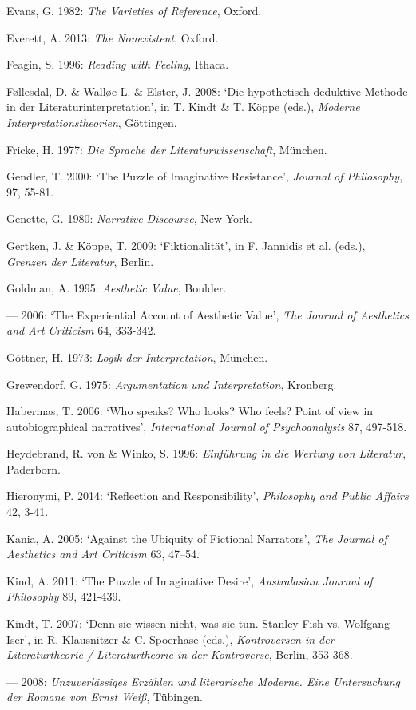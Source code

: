 \begin{hangparas}{.5cm}{1}
Evans, G. 1982: \emph{The Varieties of Reference}, Oxford. 

Everett, A. 2013: \emph{The Nonexistent}, Oxford. 

Feagin, S. 1996: \emph{Reading with Feeling}, Ithaca.

F\o{}llesdal, D. \& Wall\o{}e L. \& Elster, J. 2008: `Die hypothetisch-deduktive Methode in der Literaturinterpretation', in T. Kindt \& T. K\"oppe (eds.), \emph{Moderne Interpretationstheorien}, G\"ottingen.

Fricke, H. 1977: \emph{Die Sprache der Literaturwissenschaft}, M\"unchen.

Gendler, T. 2000: `The Puzzle of Imaginative Resistance', \emph{Journal of Philosophy}, 97, 55-81.

Genette, G. 1980: \emph{Narrative Discourse}, New York. 

Gertken, J. \& K\"oppe, T. 2009: `Fiktionalit\"at', in F. Jannidis et al. (eds.), \emph{Grenzen der Literatur}, Berlin. 

Goldman, A. 1995: \emph{Aesthetic Value}, Boulder. 

--- 2006: `The Experiential Account of Aesthetic Value', \emph{The Journal of Aesthetics and Art Criticism} 64, 333-342.

G\"ottner, H. 1973: \emph{Logik der Interpretation}, M\"unchen.

Grewendorf, G. 1975: \emph{Argumentation und Interpretation}, Kronberg.

Habermas, T. 2006: `Who speaks? Who looks? Who feels? Point of view in autobiographical narratives', \emph{International Journal of Psychoanalysis} 87, 497-518. 

Heydebrand, R. von \& Winko, S. 1996: \emph{Einf\"uhrung in die Wertung von Literatur}, Paderborn.

Hieronymi, P. 2014: `Reflection and Responsibility', \emph{Philosophy and Public Affairs} 42, 3-41.

Kania, A. 2005: `Against the Ubiquity of Fictional Narrators', \emph{The Journal of Aesthetics and Art Criticism} 63, 47--54.

Kind, A. 2011: `The Puzzle of Imaginative Desire', \emph{Australasian Journal of Philosophy} 89, 421-439.

Kindt, T. 2007: `Denn sie wissen nicht, was sie tun. Stanley Fish vs. Wolfgang Iser', in R. Klausnitzer \& C. Spoerhase (eds.), \emph{Kontroversen in der Literaturtheorie / Literaturtheorie in der Kontroverse}, Berlin, 353-368.

--- 2008: \emph{Unzuverl\"assiges Erz\"ahlen und literarische Moderne. Eine Untersuchung der Romane von Ernst Wei{\ss}}, T\"ubingen. 


\end{hangparas}
